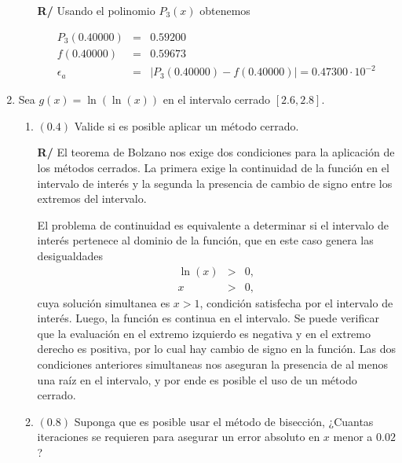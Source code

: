 \documentclass[12pt]{article}
\begin{document}
\begin{enumerate}[leftmargin=*,widest=9]
\begin{enumerate}[label=\alph*]
   \textbf{R/} Usando el polinomio \(P_3(x)\) obtenemos
   
   \begin{eqnarray*}
   P_3(0.40000) & = & 0.59200 \\
   f(0.40000) & = & 0.59673 \\
   \epsilon_a & = & | P_3(0.40000) - f(0.40000) | = 0.47300 \cdot 10^{-2}
\end{eqnarray*}      
   
   \end{enumerate}
   
   \item Sea \(g(x) = \ln(\ln(x)) \) en el intervalo cerrado \( [2.6, 2.8] \).
   \begin{enumerate}[label=\alph*]
   
   \item \((0.4)\) Valide si es posible aplicar un método cerrado.
   
   
\textbf{R/} El teorema de Bolzano nos exige dos condiciones para la aplicación de los métodos cerrados. La primera exige la continuidad de la función en el intervalo de interés y la segunda la presencia de cambio de signo entre los extremos del intervalo.
   
El problema de continuidad es equivalente a determinar si el intervalo de interés pertenece al dominio de la función, que en este caso genera las desigualdades
\begin{eqnarray*}
\ln(x) & > & 0, \\
x & > & 0,
\end{eqnarray*}
cuya solución simultanea es \( x > 1 \), condición satisfecha por el intervalo de interés. Luego, la función es continua en el intervalo.
Se puede verificar que la evaluación en el extremo izquierdo es negativa y en el extremo derecho es positiva, por lo cual hay cambio de signo en la función.
Las dos condiciones anteriores simultaneas nos aseguran la presencia de al menos una raíz en el intervalo, y por ende es posible el uso de un método cerrado.
   
   \item \((0.8)\) Suponga que es posible usar el método de bisección, ¿Cuantas iteraciones se requieren para asegurar un error absoluto en \(x\) menor a \(0.02\) ?
   
   

\end{enumerate}
\end{enumerate}
\end{document}
